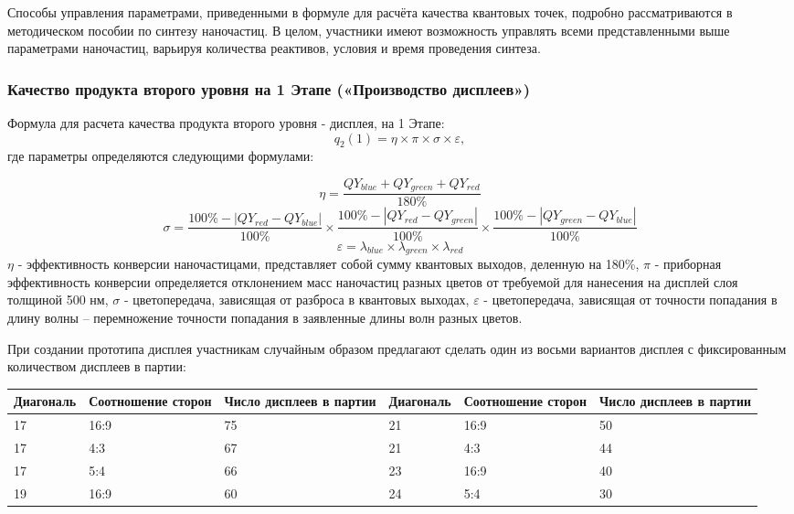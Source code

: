 Способы управления параметрами, приведенными в формуле для расчёта качества квантовых точек, подробно рассматриваются в методическом пособии по синтезу наночастиц. В целом, участники имеют возможность управлять всеми представленными выше параметрами наночастиц, варьируя количества реактивов, условия и время проведения синтеза. 

\subsubsection*{Качество продукта второго уровня на 1 Этапе («Производство дисплеев»)}
Формула для расчета качества продукта второго уровня - дисплея, на 1 Этапе:
$$q_2 (1)= \eta \times \pi \times \sigma \times \varepsilon ,$$
где параметры определяются следующими формулами:

$$\eta =  \frac{QY_{blue}+QY_{green}+QY_{red}}{180\%}$$
$$\sigma =\frac{100\%-|QY_{red}-QY_{blue} |}{100\%}\times \frac{100\%-|QY_{red}-QY_{green} |}{100\%}\times \frac{100\%-|QY_{green}-QY_{blue} |}{100\%}$$
$$\varepsilon = \lambda_{blue}\times \lambda_{green}\times \lambda_{red}$$
$\eta$ - эффективность конверсии наночастицами, представляет собой сумму квантовых выходов, деленную на 180\%,  $\pi$ - приборная эффективность конверсии определяется отклонением масс наночастиц разных цветов от требуемой для нанесения на дисплей слоя толщиной 500 нм, $\sigma$ - цветопередача, зависящая от разброса в квантовых выходах, $\varepsilon$ - цветопередача, зависящая от точности попадания в длину волны – перемножение точности попадания в заявленные длины волн разных цветов.

При создании прототипа дисплея участникам случайным образом предлагают сделать один из восьми вариантов дисплея с фиксированным количеством дисплеев в партии:

\begin{table}[H]
	\begin{center}
		\begin{tabular}{|p{2cm}|p{2cm}|p{2cm}|p{2cm}|p{2cm}|p{2cm}}
			\hline
			Диагональ	&Соотношение сторон	&Число дисплеев в партии	&Диагональ	&Соотношение сторон	&Число дисплеев в партии \\
			\hline
			17	&16:9	&75&	21&	16:9&	50 \\
			\hline
			17&	4:3	&67&	21&	4:3&	44 \\
			\hline
			17	&5:4&	66&	23&	16:9&	40 \\
			\hline
			19&	16:9&	60&	24	&5:4	&30 \\
			\hline
		\end{tabular}
	\end{center}
\end{table}

